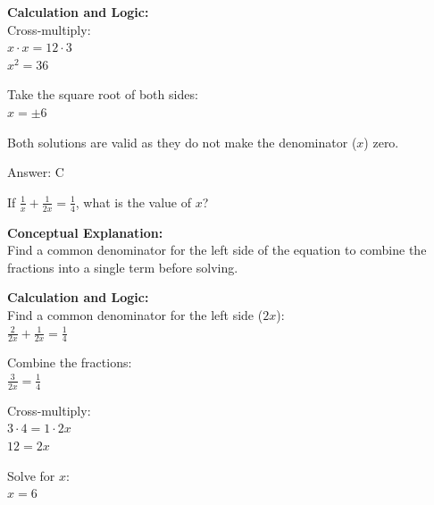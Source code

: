\documentclass[11pt,paper=a4,answers]{exam}
\begin{document}
\begin{questions}
\begin{solution}
\vspace{20pt}

\textbf{Calculation and Logic:} \\
Cross-multiply: \\
$x \cdot x = 12 \cdot 3$ \\
$x^2 = 36$

\vspace{10pt}

Take the square root of both sides: \\
$x = \pm 6$

\vspace{10pt}

Both solutions are valid as they do not make the denominator ($x$) zero.

\vspace{25pt}

Answer: \colorbox{yellow!100}{C}
\end{solution}

\vspace{40pt}

\question
If $\frac{1}{x} + \frac{1}{2x} = \frac{1}{4}$, what is the value of $x$?

\begin{solution}
\textbf{Conceptual Explanation:} \\
Find a common denominator for the left side of the equation to combine the fractions into a single term before solving.

\vspace{20pt}

\textbf{Calculation and Logic:} \\
Find a common denominator for the left side ($2x$): \\
$\frac{2}{2x} + \frac{1}{2x} = \frac{1}{4}$

\vspace{10pt}

Combine the fractions: \\
$\frac{3}{2x} = \frac{1}{4}$

\vspace{10pt}

Cross-multiply: \\
$3 \cdot 4 = 1 \cdot 2x$ \\
$12 = 2x$

\vspace{10pt}

Solve for $x$: \\
$x = 6$


\end{solution}
\end{questions}
\end{document}
